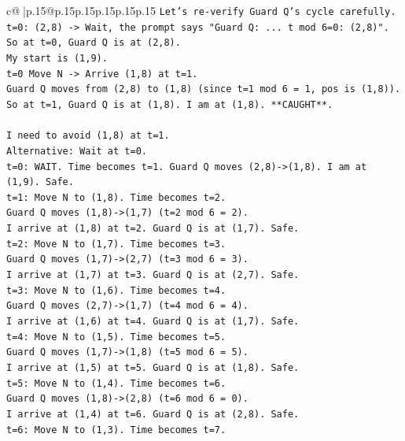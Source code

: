 \documentclass{article}
\begin{document}
{\begin{supertabular}{c@{$\;$}|p{.15\linewidth}@{}p{.15\linewidth}p{.15\linewidth}p{.15\linewidth}p{.15\linewidth}p{.15\linewidth}}
{{{\texttt{Let's re{-}verify Guard Q's cycle carefully.} \\
\texttt{t=0: (2,8) {-}> Wait, the prompt says "Guard Q: ... t mod 6=0: (2,8)".} \\
\texttt{So at t=0, Guard Q is at (2,8).} \\
\texttt{My start is (1,9).} \\
\texttt{t=0 Move N {-}> Arrive (1,8) at t=1.} \\
\texttt{Guard Q moves from (2,8) to (1,8) (since t=1 mod 6 = 1, pos is (1,8)).} \\
\texttt{So at t=1, Guard Q is at (1,8). I am at (1,8). **CAUGHT**.} \\
\\ 
\texttt{I need to avoid (1,8) at t=1.} \\
\texttt{Alternative: Wait at t=0.} \\
\texttt{t=0: WAIT. Time becomes t=1. Guard Q moves (2,8){-}>(1,8). I am at (1,9). Safe.} \\
\texttt{t=1: Move N to (1,8). Time becomes t=2.} \\
\texttt{Guard Q moves (1,8){-}>(1,7) (t=2 mod 6 = 2).} \\
\texttt{I arrive at (1,8) at t=2. Guard Q is at (1,7). Safe.} \\
\texttt{t=2: Move N to (1,7). Time becomes t=3.} \\
\texttt{Guard Q moves (1,7){-}>(2,7) (t=3 mod 6 = 3).} \\
\texttt{I arrive at (1,7) at t=3. Guard Q is at (2,7). Safe.} \\
\texttt{t=3: Move N to (1,6). Time becomes t=4.} \\
\texttt{Guard Q moves (2,7){-}>(1,7) (t=4 mod 6 = 4).} \\
\texttt{I arrive at (1,6) at t=4. Guard Q is at (1,7). Safe.} \\
\texttt{t=4: Move N to (1,5). Time becomes t=5.} \\
\texttt{Guard Q moves (1,7){-}>(1,8) (t=5 mod 6 = 5).} \\
\texttt{I arrive at (1,5) at t=5. Guard Q is at (1,8). Safe.} \\
\texttt{t=5: Move N to (1,4). Time becomes t=6.} \\
\texttt{Guard Q moves (1,8){-}>(2,8) (t=6 mod 6 = 0).} \\
\texttt{I arrive at (1,4) at t=6. Guard Q is at (2,8). Safe.} \\
\texttt{t=6: Move N to (1,3). Time becomes t=7.} \\
}}}
\end{supertabular}}
\end{document}
